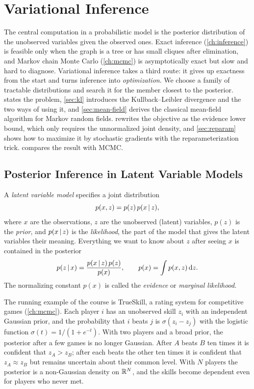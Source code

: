 \chapter{Variational Inference}\label{ch:vi}

The central computation in a probabilistic model is the posterior distribution of the unobserved variables given the observed ones. Exact inference (\cref{ch:inference}) is feasible only when the graph is a tree or has small cliques after elimination, and Markov chain Monte Carlo (\cref{ch:mcmc}) is asymptotically exact but slow and hard to diagnose. Variational inference takes a third route: it gives up exactness from the start and turns inference into \emph{optimization}. We choose a family of tractable distributions and search it for the member closest to the posterior.  states the problem, \cref{sec:kl} introduces the Kullback--Leibler divergence and the two ways of using it, and \cref{sec:mean-field} derives the classical mean-field algorithm for Markov random fields.  rewrites the objective as the evidence lower bound, which only requires the unnormalized joint density, and \cref{sec:reparam} shows how to maximize it by stochastic gradients with the reparameterization trick.  compares the result with MCMC.

\section{Posterior Inference in Latent Variable Models}\label{sec:vi-posterior}

A \emph{latent variable model} specifies a joint distribution
\[
p(x,z)=p(z)\,p(x\,|\, z),
\]
where $x$ are the observations, $z$ are the unobserved (latent) variables, $p(z)$ is the \emph{prior}, and $p(x\,|\, z)$ is the \emph{likelihood}, the part of the model that gives the latent variables their meaning. Everything we want to know about $z$ after seeing $x$ is contained in the posterior
\[
p(z\,|\, x)=\frac{p(x\,|\, z)\,p(z)}{p(x)},\qquad p(x)=\int p(x,z)\,\mathrm{d} z .
\]
The normalizing constant $p(x)$ is called the \emph{evidence} or \emph{marginal likelihood}.

\begin{remark}[TrueSkill]\label{rem:vi-trueskill}
The running example of the course is TrueSkill, a rating system for competitive games (\cref{ch:mcmc}). Each player $i$ has an unobserved skill $z_i$ with an independent Gaussian prior, and the probability that $i$ beats $j$ is $\sigma(z_i-z_j)$ with the logistic function $\sigma(t)=1/(1+e^{-t})$. With two players and a broad prior, the posterior after a few games is no longer Gaussian. After $A$ beats $B$ ten times it is confident that $z_A>z_B$; after each beats the other ten times it is confident that $z_A\approx z_B$ but remains uncertain about their common level. With $N$ players the posterior is a non-Gaussian density on $\mathbb{R}^N$, and the skills become dependent even for players who never met.
\end{remark}

